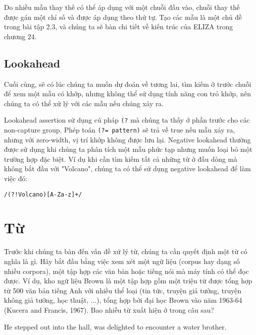 Do nhiều mẫu thay thế có thể áp dụng với một chuỗi đầu vào, chuỗi thay thế được gán một chỉ số và được áp dụng theo thứ tự. Tạo các mẫu là một chủ đề trong bài tập 2.3, và chúng ta sẽ bàn chi tiết về kiến trúc của ELIZA trong chương 24.

\vspace{20em}

\subsection{Lookahead}

Cuối cùng, sẽ có lúc chúng ta muốn dự đoán về tương lai, tìm kiếm ở trước chuỗi để xem một mẫu có khớp, nhưng không thể sử dụng tính năng con trỏ khớp, nên chúng ta có thể xử lý với các mẫu nếu chúng xảy ra.

Lookahead assertion sử dụng cú pháp \verb|(?| mà chúng ta thấy ở phần trước cho các non-capture group.
Phép toán \verb|(?= pattern)| sẽ trả về true nếu mẫu xảy ra, nhưng với zero-width, vị trí khớp không được lưu lại.
Negative lookahead thường được sử dụng khi chúng ta phân tích một mẫu phức tạp nhưng muốn loại bỏ một trường hợp đặc biệt.
Ví dụ khi cần tìm kiếm tất cả những từ ở đầu dòng mà không bắt đầu với "Volcano", chúng ta có thể sử dụng negative lookahead để làm việc đó:

\vspace{0.6em}

\noindent \texttt{/(?!Volcano)[A-Za-z]+/}

\vspace{0.6em}

\section{Từ}

Trước khi chúng ta bàn đến vấn đề xử lý từ, chúng ta cần quyết định một từ có nghĩa là gì. Hãy bắt đầu bằng việc xem xét một ngữ liệu (corpus hay dạng số nhiều corpora), một tập hợp các văn bản hoặc tiếng nói mà máy tính có thể đọc được. Ví dụ, kho ngữ liệu Brown là một tập hợp gồm một triệu từ được tổng hợp từ 500 văn bản tiếng Anh với nhiều thể loại (tin tức, truyện giả tưởng, truyện không giả tưởng, học thuật, ...), tổng hợp bởi đại học Brown vào năm 1963-64 (Kucera and Francis, 1967). Bao nhiều từ xuất hiện ở trong câu sau?

\hspace{0.8cm} He stepped out into the hall, was delighted to encounter a water brother.

